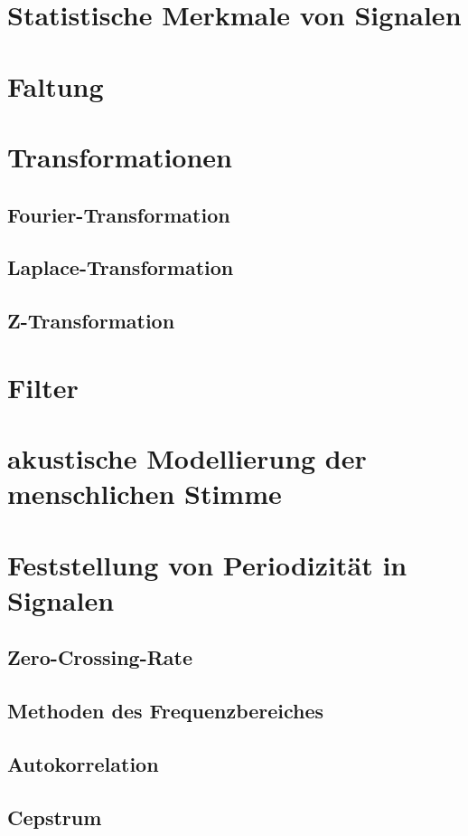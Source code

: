 \section{Statistische Merkmale von Signalen}
\section{Faltung}
\section{Transformationen}
\subsection{Fourier-Transformation}
\subsection{Laplace-Transformation}
\subsection{Z-Transformation}
\section{Filter}
\section{akustische Modellierung der menschlichen Stimme}
\section{Feststellung von Periodizität in Signalen}
\subsection{Zero-Crossing-Rate}
\subsection{Methoden des Frequenzbereiches}
\subsection{Autokorrelation}
\subsection{Cepstrum}